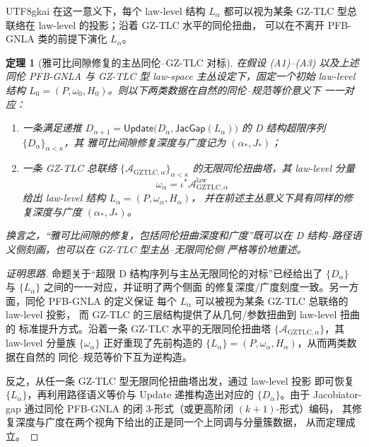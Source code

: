 \documentclass[12pt]{article}
\newtheorem{theorem}{定理}[section]
\newcommand{\JacGap}{\mathsf{JacGap}}
\begin{document}
\begin{CJK*}{UTF8}{gkai}
在这一意义下，每个 law-level 结构 $L_\alpha$ 都可以视为某条
GZ-TLC 型总联络在 law-level 的投影；沿着 GZ-TLC 水平的同伦扭曲，
可以在不离开 PFB-GNLA 类的前提下演化 $L_\alpha$。

\begin{theorem}[雅可比间隙修复的主丛同伦--GZ-TLC 对标]
在假设 \textnormal{(A1)}--\textnormal{(A3)} 以及上述同伦 PFB-GNLA 与
  GZ-TLC 型 law-space 主丛设定下，固定一个初始 law-level 结构
  $L_0=(P,\omega_0,H_0)$。则以下两类数据在自然的同伦--规范等价意义下
  一一对应：
  \begin{enumerate}
    \item 一条满足递推
          $D_{\alpha+1}
           =\mathsf{Update}\bigl(D_\alpha,\JacGap(L_\alpha)\bigr)$
          的 D 结构超限序列 $\{D_\alpha\}_{\alpha<\kappa}$，其
          雅可比间隙修复深度与广度记为 $(\alpha_\ast,J_\ast)$；
    \item 一条 GZ-TLC 总联络
          $\{\mathcal{A}_{\mathrm{GZTLC},\alpha}\}_{\alpha<\kappa}$
          的无限同伦扭曲塔，其 law-level 分量
          \[
            \omega_\alpha
            =
            \iota^\ast
            \mathcal{A}^{\mathrm{law}}_{\mathrm{GZTLC},\alpha}
          \]
          给出 law-level 结构 $L_\alpha=(P,\omega_\alpha,H_\alpha)$，
          并在前述主丛意义下具有同样的修复深度与广度
          $(\alpha_\ast,J_\ast)$。
  \end{enumerate}
换言之，“雅可比间隙的修复，包括同伦扭曲深度和广度”既可以在
  D 结构--路径语义侧刻画，也可以在 GZ-TLC 型主丛--无限同伦侧
  严格等价地重述。
\end{theorem}

\begin{proof}[证明思路]
命题关于“超限 D 结构序列与主丛无限同伦的对标”已经给出了
$\{D_\alpha\}$ 与 $\{L_\alpha\}$ 之间的一一对应，并证明了两个侧面
的修复深度/广度刻度一致。另一方面，同伦 PFB-GNLA 的定义保证
每个 $L_\alpha$ 可以被视为某条 GZ-TLC 总联络的 law-level 投影，
而 GZ-TLC 的三层结构提供了从几何/参数扭曲到 law-level 扭曲的
标准提升方式。沿着一条 GZ-TLC 水平的无限同伦扭曲塔
$\{\mathcal{A}_{\mathrm{GZTLC},\alpha}\}$，其 law-level 分量族
$\{\omega_\alpha\}$ 正好重现了先前构造的
$\{L_\alpha\}=(P,\omega_\alpha,H_\alpha)$，从而两类数据在自然的
同伦--规范等价下互为逆构造。

反之，从任一条 GZ-TLC 型无限同伦扭曲塔出发，通过 law-level 投影
即可恢复 $\{L_\alpha\}$，再利用路径语义等价与
Update 递推构造出对应的 $\{D_\alpha\}$。由于 Jacobiator-gap
通过同伦 PFB-GNLA 的闭 3-形式（或更高阶闭 $(k+1)$-形式）编码，
其修复深度与广度在两个视角下给出的正是同一个上同调与分量簇数据，
从而定理成立。
\end{proof}


\end{CJK*}
\end{document}
